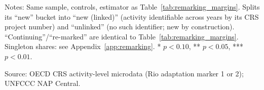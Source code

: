\begin{table}[H]
\centering
\caption{Margin decomposition with unlinked (singleton) activities isolated as a fourth bucket}
\label{tab:remarking_margins_unlinked}
\begingroup\small
{}
\endgroup
\par\vspace{4pt}
\begin{minipage}{\linewidth}\footnotesize
Notes: Same sample, controls, estimator as Table~\ref{tab:remarking_margins}. Splits its ``new'' bucket into ``new (linked)'' (activity identifiable across years by its CRS project number) and ``unlinked'' (no such identifier; new by construction). ``Continuing''/``re-marked'' are identical to Table~\ref{tab:remarking_margins}. Singleton shares: see Appendix~\ref{app:remarking}. * $p<0.10$, ** $p<0.05$, *** $p<0.01$.\par
Source: OECD CRS activity-level microdata (Rio adaptation marker 1 or 2); UNFCCC NAP Central.
\end{minipage}
\end{table}
